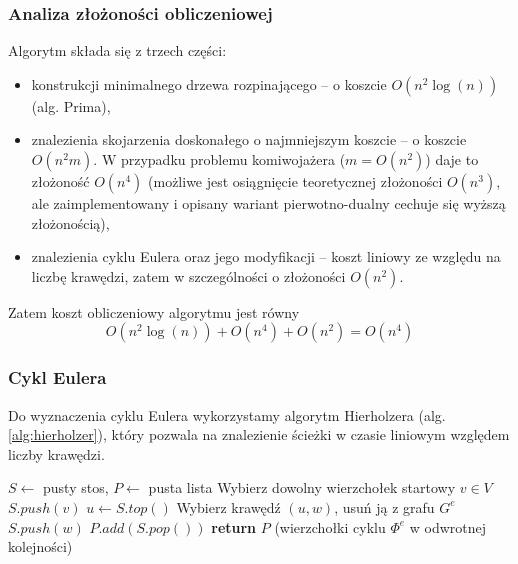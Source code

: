 \documentclass{article}
\theoremstyle{definition}
\theoremstyle{plain}
\theoremstyle{remark}
\begin{document}
\subsubsection{Analiza złożoności obliczeniowej}
Algorytm składa się z trzech części: 
    \begin{itemize}
        \item konstrukcji minimalnego drzewa rozpinającego -- o koszcie $O(n^2\log(n))$ (alg. Prima),
        \item znalezienia skojarzenia doskonałego o najmniejszym koszcie -- o koszcie $O(n^2 m)$. W przypadku problemu komiwojażera ($m = O(n^2)$) daje to złożoność $O(n^4)$ (możliwe jest osiągnięcie teoretycznej złożoności $O(n^3)$, ale zaimplementowany i opisany wariant pierwotno-dualny cechuje się wyższą złożonością),
        \item znalezienia cyklu Eulera oraz jego modyfikacji -- koszt liniowy ze względu na liczbę krawędzi, zatem w szczególności o złożoności $O(n^2)$.
    \end{itemize}
Zatem koszt obliczeniowy algorytmu jest równy
\begin{equation*}
    O(n^2\log(n)) + O(n^4) + O(n^2) = O(n^4)
\end{equation*}

\subsubsection{Cykl Eulera}
Do wyznaczenia cyklu Eulera wykorzystamy algorytm Hierholzera (alg. \ref{alg:hierholzer}), który pozwala na znalezienie ścieżki w czasie liniowym względem liczby krawędzi.

\begin{algorithm}[H]
    \caption{Algorytm Hierholzera (Wyznaczanie cyklu Eulera)}
    \label{alg:hierholzer}
    \begin{algorithmic}[1]
        \State $S \gets$ pusty stos, 
        \State $P \gets$ pusta lista 
        \State Wybierz dowolny wierzchołek startowy $v \in V$
        \State $S.push(v)$
            \State $u \gets S.top()$
                \State Wybierz krawędź $(u, w)$, usuń ją z grafu $G^e$
                \State $S.push(w)$
            \Else
                \State $P.add(S.pop())$
            \EndIf
        \EndWhile
        \State \textbf{return} $P$ (wierzchołki cyklu $\Phi^e$ w odwrotnej kolejności)
    \end{algorithmic}
\end{algorithm}
\end{document}
